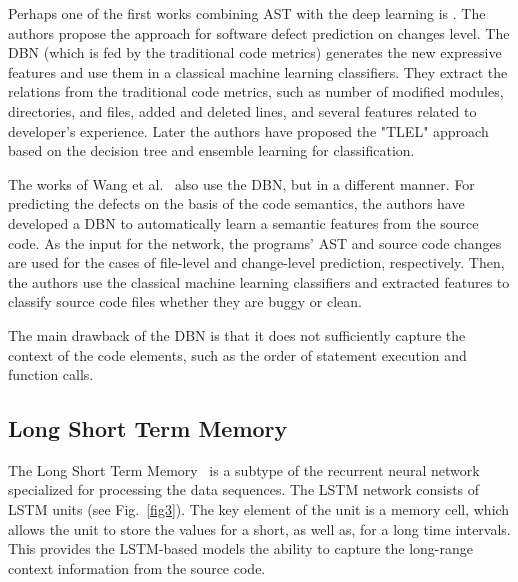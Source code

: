 \documentclass[mathematics,review,submit,moreauthors,pdftex]{Definitions/mdpi}
\begin{document}
Perhaps one of the first works combining AST with the deep learning is \cite{YangEtAl2015}. The authors propose the approach for software defect prediction on changes level. 
The DBN (which is fed by the traditional code metrics) generates the new expressive features and use them in a classical machine learning classifiers. 
They extract the relations from the traditional code metrics, such as number of modified modules, directories, and files, added and deleted lines, and several features related to developer's experience. Later the authors have proposed the "TLEL" approach~\cite{YangEtAl2017} based on the decision tree and ensemble learning for classification. %

The works of Wang et al.~\cite{WangEtAl2016, WangEtAl2018} also use the DBN, but in a different manner.
For predicting the defects on the basis of the code semantics, the authors have developed a DBN to automatically learn a semantic features from the source code. As the input for the network, the programs' AST and source code changes are used for the cases of file-level and change-level prediction, respectively. 
Then, the authors use the classical machine learning classifiers and extracted features to classify source code files whether they are buggy or clean.

The main drawback of the DBN is that it does not sufficiently capture the context of the code elements, such as the order of statement execution and function calls.

\subsection{Long Short Term Memory}

The Long Short Term Memory~\cite{Hochreiter1997lstm} is a subtype of the recurrent neural network specialized for processing the data sequences. The LSTM network consists of LSTM units (see Fig.~\ref{fig3}). The key element of the unit is a memory cell, which allows the unit to store the values for a short, as well as, for a long time intervals. This provides the LSTM-based models the ability to capture the long-range context information from the source code.
\end{document}
